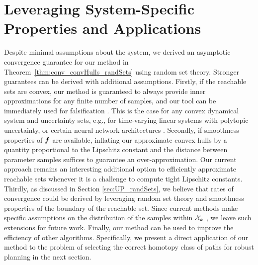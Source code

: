 \documentclass{article}
\begin{document}
\vspace{-4mm}
\section{Leveraging System-Specific Properties and Applications}\label{sec:applications}
\vspace{-2mm}

Despite minimal assumptions about the system, we derived an asymptotic convergence guarantee for our method in Theorem~\ref{thm:conv_convHulls_randSets} using random set theory. Stronger guarantees can be derived with additional assumptions. Firstly, if the reachable sets are convex, our method is guaranteed to always provide inner approximations for any finite number of samples, and our tool can be immediately used for falsification \citep{BhatiaIncrem2004}. This is the case for any convex dynamical system and uncertainty sets, e.g., for time-varying linear systems with polytopic uncertainty, or certain neural network architectures \citep{Amos2017,Chen2019ICLR}. Secondly, if smoothness properties of $\bm{f}$ are available, inflating our approximate convex hulls by a quantity proportional to the Lipschitz constant and the distance between parameter samples suffices to guarantee an over-approximation. 
Our current approach remains an interesting additional option to efficiently approximate reachable sets whenever it is a challenge to compute tight Lipschitz constants. Thirdly, as discussed in Section \ref{sec:UP_randSets}, we believe that rates of convergence could be derived by leveraging  random set theory and smoothness properties of the boundary of the reachable set. Since current methods make specific assumptions on the distribution of the samples within $\mathcal{X}_k$ \citep{Kor1993_BookMinimaxImgReconstr,Rodriguez2016}, we leave such extensions for future work. Finally, our method can be used to improve the efficiency of other algorithms. Specifically, we present a direct application of our method to the problem of selecting the correct homotopy class of paths for robust planning in the next section. 




\vspace{-2mm}
\end{document}
